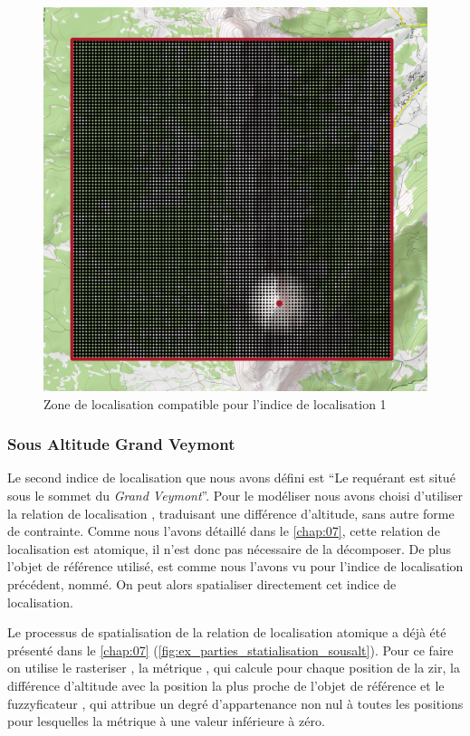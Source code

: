 \begin{figure}
  \centering
  \includegraphics{./figures/PasSommet_GrandVeymont.png}
  \caption{Zone de localisation compatible pour l'indice de
    localisation 1}
  \label{fig:ZLC_GrandVeymont_1}
\end{figure}

\subsubsection{Sous Altitude Grand Veymont}

Le second indice de localisation que nous avons défini est \enquote{Le
  requérant est situé sous le sommet du \emph{Grand Veymont}}. Pour le
modéliser nous avons choisi d'utiliser la relation de localisation
, traduisant une différence d'altitude, sans
autre forme de contrainte. Comme nous l'avons détaillé dans le
\autoref{chap:07}, cette relation de localisation est atomique, il
n'est donc pas nécessaire de la décomposer. De plus l'objet de
référence utilisé, est comme nous l'avons vu pour l'indice de
localisation précédent, nommé. On peut alors spatialiser directement
cet indice de localisation.

Le processus de spatialisation de la relation de localisation atomique
 a déjà été présenté dans le
\autoref{chap:07}
(\autoref{fig:ex_parties_statialisation_sousalt}). Pour ce faire on
utilise le rasteriser , la métrique
, qui calcule pour chaque position de
la \ac{zir}, la différence d'altitude avec la position la plus proche
de l'objet de référence et le fuzzyficateur ,
qui attribue un degré d'appartenance non nul à toutes les positions
pour lesquelles la métrique à une valeur inférieure à zéro.

